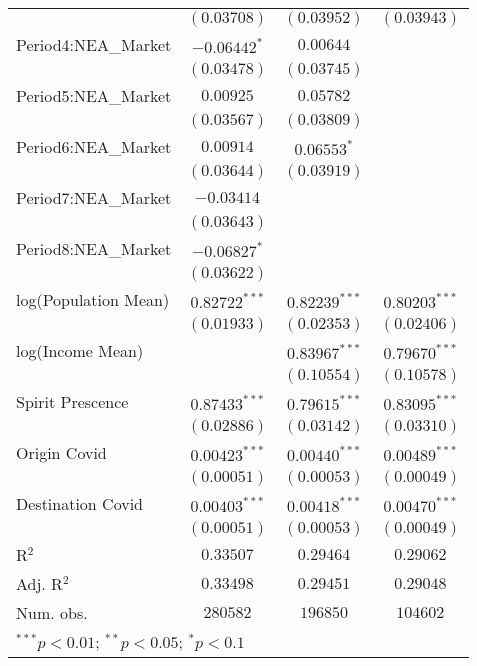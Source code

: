 \begin{tabular}{l c c c}
                     & $(0.03708)$      & $(0.03952)$      & $(0.03943)$      \\
Period4:NEA\_Market  & $-0.06442^{*}$   & $0.00644$        &                  \\
                     & $(0.03478)$      & $(0.03745)$      &                  \\
Period5:NEA\_Market  & $0.00925$        & $0.05782$        &                  \\
                     & $(0.03567)$      & $(0.03809)$      &                  \\
Period6:NEA\_Market  & $0.00914$        & $0.06553^{*}$    &                  \\
                     & $(0.03644)$      & $(0.03919)$      &                  \\
Period7:NEA\_Market  & $-0.03414$       &                  &                  \\
                     & $(0.03643)$      &                  &                  \\
Period8:NEA\_Market  & $-0.06827^{*}$   &                  &                  \\
                     & $(0.03622)$      &                  &                  \\
log(Population Mean) & $0.82722^{***}$  & $0.82239^{***}$  & $0.80203^{***}$  \\
                     & $(0.01933)$      & $(0.02353)$      & $(0.02406)$      \\
log(Income Mean)     &                  & $0.83967^{***}$  & $0.79670^{***}$  \\
                     &                  & $(0.10554)$      & $(0.10578)$      \\
Spirit Prescence     & $0.87433^{***}$  & $0.79615^{***}$  & $0.83095^{***}$  \\
                     & $(0.02886)$      & $(0.03142)$      & $(0.03310)$      \\
Origin Covid         & $0.00423^{***}$  & $0.00440^{***}$  & $0.00489^{***}$  \\
                     & $(0.00051)$      & $(0.00053)$      & $(0.00049)$      \\
Destination Covid    & $0.00403^{***}$  & $0.00418^{***}$  & $0.00470^{***}$  \\
                     & $(0.00051)$      & $(0.00053)$      & $(0.00049)$      \\
\hline
R$^2$                & $0.33507$        & $0.29464$        & $0.29062$        \\
Adj. R$^2$           & $0.33498$        & $0.29451$        & $0.29048$        \\
Num. obs.            & $280582$         & $196850$         & $104602$         \\
\hline
\multicolumn{4}{l}{\scriptsize{$^{***}p<0.01$; $^{**}p<0.05$; $^{*}p<0.1$}}
\end{tabular}
